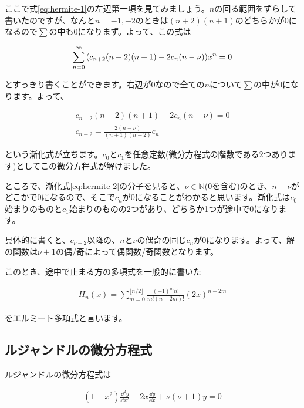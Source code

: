 ここで式\ref{eq:hermite-1}の左辺第一項を見てみましょう。$n$の回る範囲をずらして書いたのですが、なんと$n=-1,-2$のときは$(n+2)(n+1)$のどちらかが0になるので$\sum$の中も0になりまず。よって、この式は

\begin{eqnarray}
    \sum_{n=0}^\infty \pqty{c_{n+2}(n+2)(n+1)-2c_n(n-\nu)}x^n=0
\end{eqnarray}

\noindent
とすっきり書くことができます。右辺が0なので全ての$n$について$\sum$の中が0になります。よって、

\begin{eqnarray}
    c_{n+2}(n+2)(n+1)-2c_n(n-\nu)=0 \\
    c_{n+2}=\frac{2(n-\nu)}{(n+1)(n+2)}c_n
    \label{eq:hermite-2}
\end{eqnarray}

\noindent
という漸化式が立ちます。$c_0$と$c_1$を任意定数(微分方程式の階数である2つあります)としてこの微分方程式が解けました。

ところで、漸化式\ref{eq:hermite-2}の分子を見ると、$\nu\in\mathbb{N}$(0を含む)のとき、$n-\nu$がどこかで0になるので、そこで$c_n$が0になることがわかると思います。漸化式は$c_0$始まりのものと$c_1$始まりのものの2つがあり、どちらか1つが途中で0になります。

具体的に書くと、$c_{\nu+2}$以降の、$n$と$\nu$の偶奇の同じ$c_n$が0になります。よって、解の関数は$\nu+1$の偶/奇によって偶関数/奇関数となります。


このとき、途中で止まる方の多項式を一般的に書いた

\begin{eqnarray}
H_n(x)=\sum_{m=0}^{\lfloor n/2\rfloor}\frac{(-1)^m n!}{m!(n-2m)!}(2x)^{n-2m}
\end{eqnarray}

\noindent
をエルミート多項式と言います。

\fi









\subsection{ルジャンドルの微分方程式}
\label{legendre}
ルジャンドルの微分方程式は

\begin{eqnarray}
(1-x^2)\frac{\dd^2 y}{\dd x^2}-2x\frac{\dd y}{\dd x}+\nu(\nu+1)y=0
\end{eqnarray}

